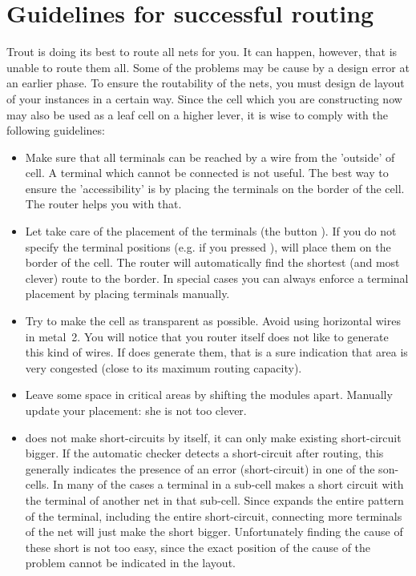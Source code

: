\section{Guidelines for successful routing}
\label{routeguidelines}
Trout is doing its best to route all nets for you. It can
happen, however, that  is unable to route them
all. Some of the problems may be cause by a design error at
an earlier phase. To ensure the routability of the nets,
you must design de layout of your instances in a certain
way. Since the cell which you are constructing now may also be
used as a leaf cell on a higher lever, it is wise to comply
with the following guidelines:
\begin{itemize}
\item
Make sure that all terminals can be reached by a wire from
the 'outside' of cell. A terminal which cannot be connected
is not useful. The best way to ensure the 'accessibility'
is by placing the terminals on the border of the cell. The
router helps you with that.
\item
Let  take care of the placement of the terminals (the button
). If you do not specify the terminal 
positions (e.g. if you pressed ),  will place
them on the border of the cell. The router will automatically find the shortest
(and most clever) route to the border. In special cases you can always enforce
a terminal placement by placing terminals manually.
\item
Try to make the cell as transparent as possible. Avoid using horizontal wires
in metal~2. You will notice that you router itself does not like to generate
this kind of wires.  If  does generate them, that is a sure
indication that area is very congested (close to its maximum routing
capacity).
\item
Leave some space in critical areas by shifting the modules apart. Manually
update your  placement: she is not too clever.
\item
{}
 does not make short-circuits by itself, it can only make
existing short-circuit bigger.
If the automatic checker detects a short-circuit after
routing, this generally indicates the presence of an error (short-circuit) in
one of the son-cells.  In many of the cases a terminal in a sub-cell makes a
short circuit with the terminal of another net in that sub-cell. Since
 expands the entire pattern of the terminal, including the entire
short-circuit, connecting more terminals of the net will just make the short
bigger. Unfortunately finding the cause of these short is not too easy, since
the exact position of the cause of the problem cannot be indicated in the
layout.
\end{itemize}

